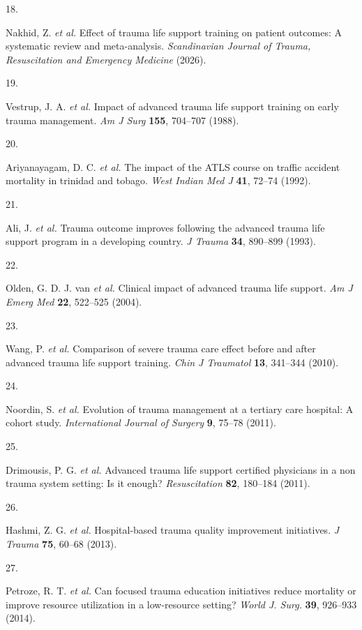 \documentclass[
]{scrartcl}
\newlength{\cslhangindent}
\newlength{\csllabelwidth}
\newenvironment{CSLReferences}[2] %
 {\begin{list}{}{%
  \setlength{\itemindent}{0pt}
  \setlength{\leftmargin}{0pt}
  \setlength{\parsep}{0pt}
  \ifodd #1
   \setlength{\leftmargin}{\cslhangindent}
   \setlength{\itemindent}{-1\cslhangindent}
  \fi
  \setlength{\itemsep}{#2\baselineskip}}}
 {\end{list}}
\newcommand{\CSLLeftMargin}[1]{\parbox[t]{\csllabelwidth}{\strut#1\strut}}
\newcommand{\CSLRightInline}[1]{\parbox[t]{\linewidth - \csllabelwidth}{\strut#1\strut}}
\begin{document}
\begin{CSLReferences}{0}{0}
\CSLLeftMargin{18. }%
\CSLRightInline{Nakhid, Z. \emph{et al.} Effect of trauma life support
training on patient outcomes: A systematic review and meta-analysis.
\emph{Scandinavian Journal of Trauma, Resuscitation and Emergency
Medicine} (2026).}

\CSLLeftMargin{19. }%
\CSLRightInline{Vestrup, J. A. \emph{et al.} Impact of advanced trauma
life support training on early trauma management. \emph{Am J Surg}
\textbf{155}, 704--707 (1988).}

\CSLLeftMargin{20. }%
\CSLRightInline{Ariyanayagam, D. C. \emph{et al.} The impact of the ATLS
course on traffic accident mortality in trinidad and tobago. \emph{West
Indian Med J} \textbf{41}, 72--74 (1992).}

\CSLLeftMargin{21. }%
\CSLRightInline{Ali, J. \emph{et al.} Trauma outcome improves following
the advanced trauma life support program in a developing country.
\emph{J Trauma} \textbf{34}, 890--899 (1993).}

\CSLLeftMargin{22. }%
\CSLRightInline{Olden, G. D. J. van \emph{et al.} Clinical impact of
advanced trauma life support. \emph{Am J Emerg Med} \textbf{22},
522--525 (2004).}

\CSLLeftMargin{23. }%
\CSLRightInline{Wang, P. \emph{et al.} Comparison of severe trauma care
effect before and after advanced trauma life support training.
\emph{Chin J Traumatol} \textbf{13}, 341--344 (2010).}

\CSLLeftMargin{24. }%
\CSLRightInline{Noordin, S. \emph{et al.} Evolution of trauma management
at a tertiary care hospital: {A} cohort study. \emph{International
Journal of Surgery} \textbf{9}, 75--78 (2011).}

\CSLLeftMargin{25. }%
\CSLRightInline{Drimousis, P. G. \emph{et al.} Advanced trauma life
support certified physicians in a non trauma system setting: Is it
enough? \emph{Resuscitation} \textbf{82}, 180--184 (2011).}

\CSLLeftMargin{26. }%
\CSLRightInline{Hashmi, Z. G. \emph{et al.} Hospital-based trauma
quality improvement initiatives. \emph{J Trauma} \textbf{75}, 60--68
(2013).}

\CSLLeftMargin{27. }%
\CSLRightInline{Petroze, R. T. \emph{et al.} Can focused trauma
education initiatives reduce mortality or improve resource utilization
in a low-resource setting? \emph{World J. Surg.} \textbf{39}, 926--933
(2014).}


\end{CSLReferences}
\end{document}
